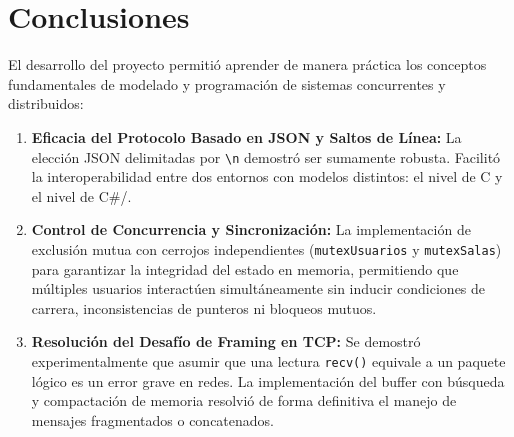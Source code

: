 \documentclass[12pt,a4paper]{article}
\begin{document}
\section{Conclusiones}

El desarrollo del  proyecto permitió aprender de manera práctica los conceptos fundamentales de modelado y programación de sistemas concurrentes y distribuidos:
\begin{enumerate}
    \item \textbf{Eficacia del Protocolo Basado en JSON y Saltos de Línea:} La elección JSON delimitadas por \texttt{\textbackslash n} demostró ser sumamente robusta. Facilitó la interoperabilidad entre dos entornos con modelos distintos: el nivel de C y el nivel de C\#/.
    \item \textbf{Control de Concurrencia y Sincronización:} La implementación de exclusión mutua con cerrojos independientes (\texttt{mutexUsuarios} y \texttt{mutexSalas}) para garantizar la integridad del estado en memoria, permitiendo que múltiples usuarios interactúen simultáneamente sin inducir condiciones de carrera, inconsistencias de punteros ni bloqueos mutuos.
    \item \textbf{Resolución del Desafío de Framing en TCP:} Se demostró experimentalmente que asumir que una lectura \texttt{recv()} equivale a un paquete lógico es un error grave en redes. La implementación del buffer con búsqueda y compactación de memoria resolvió de forma definitiva el manejo de mensajes fragmentados o concatenados.
\end{enumerate}
\end{document}
